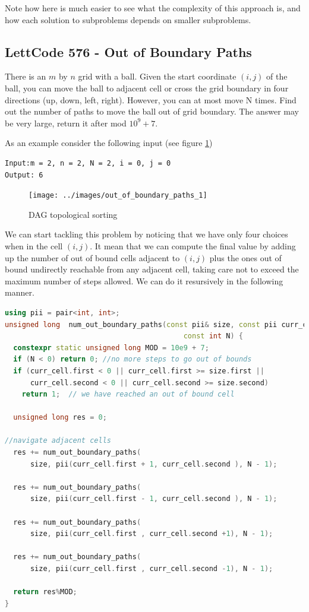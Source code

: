 Note how here is much easier to see what the complexity of this approach is, and how each solution to subproblems depends on smaller subproblems.


\subsection{LettCode 576 -  Out of Boundary Paths}
There is an $m$ by $n$ grid with a ball. Given the start coordinate $(i,j)$ of the ball, you can move the ball to adjacent cell or cross the grid boundary in four directions (up, down, left, right). However, you can at most move N times. Find out the number of paths to move the ball out of grid boundary. The answer may be very large, return it after mod $10^9 + 7$. 

As an example consider the following input (see figure \ref{fig:leet576})
\begin{verbatim}
Input:m = 2, n = 2, N = 2, i = 0, j = 0
Output: 6
\end{verbatim}

	\begin{figure}
	\label{fig:leet576}
	\centering
	\texttt{[image: ../images/out\_of\_boundary\_paths\_1]}
	\caption{DAG topological sorting}
	\end{figure}

We can start tackling this problem by noticing that we have only four choices when in the cell $(i,j)$. It mean that we can compute the final value by adding up the number of out of bound cells adjacent to $(i,j)$ plus the ones out of bound undirectly reachable from any adjacent cell, taking care not to exceed the maximum number of steps allowed. We can do it resursively in the following manner.

\begin{lstlisting}[language=c++, caption="Number of distincts paths to an out of bound cell algorithms",label=list:outofbound_naive]
using pii = pair<int, int>;
unsigned long  num_out_boundary_paths(const pii& size, const pii curr_cell,
                                          const int N) {
  constexpr static unsigned long MOD = 10e9 + 7;
  if (N < 0) return 0; //no more steps to go out of bounds
  if (curr_cell.first < 0 || curr_cell.first >= size.first ||
      curr_cell.second < 0 || curr_cell.second >= size.second)
    return 1;  // we have reached an out of bound cell

  unsigned long res = 0;

//navigate adjacent cells
  res += num_out_boundary_paths(
      size, pii(curr_cell.first + 1, curr_cell.second ), N - 1);
  
  res += num_out_boundary_paths(
      size, pii(curr_cell.first - 1, curr_cell.second ), N - 1);
  
  res += num_out_boundary_paths(
      size, pii(curr_cell.first , curr_cell.second +1), N - 1);
  
  res += num_out_boundary_paths(
      size, pii(curr_cell.first , curr_cell.second -1), N - 1);
  
  return res%MOD;
}
\end{lstlisting}

